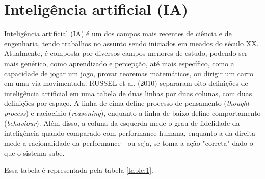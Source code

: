 % 
\section{Inteligência artificial (IA)}
\label{sec:ia}

Inteligência artificial (IA) é um dos campos mais recentes de ciência e de engenharia, tendo trabalhos no assunto sendo iniciados em meados do século XX. Atualmente, é composta por diversos campos menores de estudo, podendo ser mais genérico, como aprendizado e percepção, até mais específico, como a capacidade de jogar um jogo, provar teoremas matemáticos, ou dirigir um carro em uma via movimentada.
RUSSEL et al. (2010) separaram oito definições de inteligência artificial em uma tabela de duas linhas por duas colunas, com duas definições por espaço. A linha de cima define processo de pensamento (\textit{thought process}) e raciocínio (\textit{reasoning}), enquanto a linha de baixo define comportamento (\textit{behaviour}). Além disso, a coluna da esquerda mede o grau de fidelidade da inteligência quando comparado com performance humana, enquanto a da direita mede a racionalidade da performance - ou seja, se toma a ação "correta"{} dado o que o sistema sabe.

Essa tabela é representada pela tabela \ref{table:1}.

